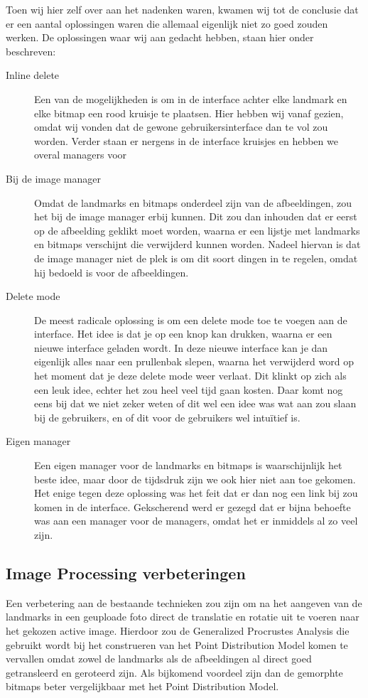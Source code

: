 Toen wij hier zelf over aan het nadenken waren, kwamen wij tot de conclusie dat er een aantal oplossingen waren die allemaal eigenlijk niet zo goed zouden werken.
De oplossingen waar wij aan gedacht hebben, staan hier onder beschreven:
\begin{description}
  \item[Inline delete] Een van de mogelijkheden is om in de interface achter elke landmark en elke bitmap een rood kruisje te plaatsen.
  Hier hebben wij vanaf gezien, omdat wij vonden dat de gewone gebruikersinterface dan te vol zou worden.
  Verder staan er nergens in de interface kruisjes en hebben we overal managers voor
  \item[Bij de image manager] Omdat de landmarks en bitmaps onderdeel zijn van de afbeeldingen, zou het bij de image manager erbij kunnen.
  Dit zou dan inhouden dat er eerst op de afbeelding geklikt moet worden, waarna er een lijstje met landmarks en bitmaps verschijnt die verwijderd kunnen worden.
  Nadeel hiervan is dat de image manager niet de plek is om dit soort dingen in te regelen, omdat hij bedoeld is voor de afbeeldingen.
  \item[Delete mode]De meest radicale oplossing is om een delete mode toe te voegen aan de interface.
  Het idee is dat je op een knop kan drukken, waarna er een nieuwe interface geladen wordt.
  In deze nieuwe interface kan je dan eigenlijk alles naar een prullenbak slepen, waarna het verwijderd word op het moment dat je deze delete mode weer verlaat.
  Dit klinkt op zich als een leuk idee, echter het zou heel veel tijd gaan kosten.
  Daar komt nog eens bij dat we niet zeker weten of dit wel een idee was wat aan zou slaan bij de gebruikers, en of dit voor de gebruikers wel intu\"{i}tief is.
  \item[Eigen manager] Een eigen manager voor de landmarks en bitmaps is waarschijnlijk het beste idee, maar door de tijdsdruk zijn we ook hier niet aan toe gekomen.
  Het enige tegen deze oplossing was het feit dat er dan nog een link bij zou komen in de interface.
  Gekscherend werd er gezegd dat er bijna behoefte was aan een manager voor de managers, omdat het er inmiddels al zo veel zijn.
\end{description}

\subsection{Image Processing verbeteringen}
Een verbetering aan de bestaande technieken zou zijn om na het aangeven van de landmarks in een geuploade foto direct de translatie en rotatie uit te voeren naar het gekozen active image. Hierdoor zou de Generalized Procrustes Analysis die gebruikt wordt bij het construeren van het Point Distribution Model komen te vervallen omdat zowel de landmarks als de afbeeldingen al direct goed getransleerd en geroteerd zijn. Als bijkomend voordeel zijn dan de gemorphte bitmaps beter vergelijkbaar met het Point Distribution Model.

